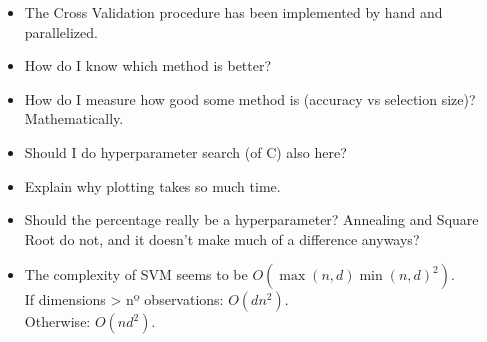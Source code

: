 \begin{itemize}
    \item The Cross Validation procedure has been implemented by hand and par\-al\-lelized.
    \item How do I know which method is better?
    \item How do I measure how good some method is (accuracy vs selection size)? Mathematically.
    \item Should I do hyperparameter search (of C) also here?
    \item Explain why plotting takes so much time.
    \item Should the percentage really be a hyperparameter? Annealing and Square Root do not, and it doesn't make much of a difference anyways?
    \item The complexity of SVM seems to be $O(\max(n, d) \min(n, d)^2)$. \\ If dimensions > nº observations: $O(dn^2)$. \\ Otherwise: $O(nd^2)$.
\end{itemize}